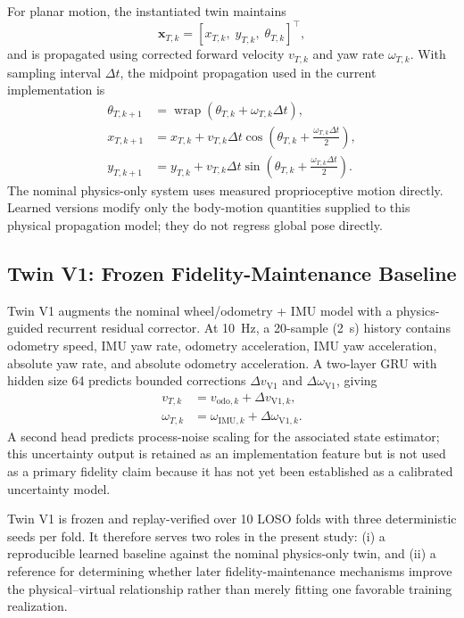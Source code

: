 \documentclass[conference]{IEEEtran}
\newcommand{\wrap}{\operatorname{wrap}}
\begin{document}
For planar motion, the instantiated twin maintains
\begin{equation}
\mathbf{x}_{T,k}=[x_{T,k},\;y_{T,k},\;\theta_{T,k}]^{\top},
\end{equation}
and is propagated using corrected forward velocity $v_{T,k}$ and yaw rate $\omega_{T,k}$. With sampling interval $\Delta t$, the midpoint propagation used in the current implementation is
\begin{align}
\theta_{T,k+1} &= \wrap(\theta_{T,k}+\omega_{T,k}\Delta t),\\
x_{T,k+1} &= x_{T,k}+v_{T,k}\Delta t
\cos\!\left(\theta_{T,k}+\frac{\omega_{T,k}\Delta t}{2}\right),\\
y_{T,k+1} &= y_{T,k}+v_{T,k}\Delta t
\sin\!\left(\theta_{T,k}+\frac{\omega_{T,k}\Delta t}{2}\right).
\end{align}
The nominal physics-only system uses measured proprioceptive motion directly. Learned versions modify only the body-motion quantities supplied to this physical propagation model; they do not regress global pose directly.

\subsection{Twin V1: Frozen Fidelity-Maintenance Baseline}
Twin V1 augments the nominal wheel/odometry + IMU model with a physics-guided recurrent residual corrector. At 10~Hz, a 20-sample (2~s) history contains odometry speed, IMU yaw rate, odometry acceleration, IMU yaw acceleration, absolute yaw rate, and absolute odometry acceleration. A two-layer GRU with hidden size 64 predicts bounded corrections $\Delta v_{\mathrm{V1}}$ and $\Delta\omega_{\mathrm{V1}}$, giving
\begin{align}
v_{T,k} &= v_{\mathrm{odo},k}+\Delta v_{\mathrm{V1},k},\\
\omega_{T,k} &= \omega_{\mathrm{IMU},k}+\Delta\omega_{\mathrm{V1},k}.
\end{align}
A second head predicts process-noise scaling for the associated state estimator; this uncertainty output is retained as an implementation feature but is not used as a primary fidelity claim because it has not yet been established as a calibrated uncertainty model.

Twin V1 is frozen and replay-verified over 10 LOSO folds with three deterministic seeds per fold. It therefore serves two roles in the present study: (i) a reproducible learned baseline against the nominal physics-only twin, and (ii) a reference for determining whether later fidelity-maintenance mechanisms improve the physical--virtual relationship rather than merely fitting one favorable training realization.
\end{document}
